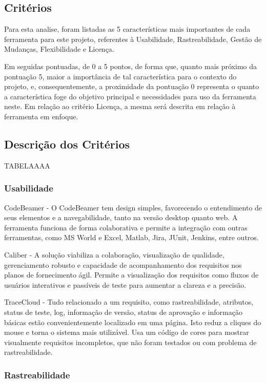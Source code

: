 \subsection {Critérios}

Para esta analise, foram listadas as 5 características mais importantes de cada ferramenta para este projeto, referentes à Usabilidade, Rastreabilidade, Gestão de Mudanças, Flexibilidade e Licença.

Em seguidas pontuadas, de 0 a 5 pontos, de forma que, quanto mais próximo da pontuação 5, maior a importância de tal característica para o contexto do projeto, e, consequentemente, a proximidade da pontuação 0 representa o quanto a característica foge do objetivo principal e necessidades para uso da ferramenta neste. Em relação ao critério Licença, a mesma será descrita em relação à ferramenta em enfoque.

\subsection {Descrição dos Critérios}

TABELAAAA

\subsubsection{Usabilidade}

CodeBeamer - O CodeBeamer tem design simples, favorecendo o entendimento de seus elementos e a navegabilidade, tanto na versão desktop quanto web. A ferramenta funciona de forma colaborativa e permite a integração com outras ferramentas, como MS World e Excel, Matlab, Jira, JUnit, Jenkins, entre outros.

Caliber - A solução viabiliza a colaboração, visualização de qualidade, gerenciamento robusto e capacidade de acompanhamento dos requisitos nos planos de fornecimento ágil. Permite a visualização dos requisitos como fluxos de usuários interativos e passíveis de teste para aumentar a clareza e a precisão.

TraceCloud - Tudo relacionado a um requisito, como rastreabilidade, atributos, status de teste, log, informação de versão, status de aprovação e informação básicas estão convenientemente localizado em uma página. Isto reduz a cliques do mouse e torna o sistema mais utilizável. Usa um código de cores para mostrar visualmente requisitos incompletos, que não foram testados ou com problema de rastreabilidade.

\subsubsection{Rastreabilidade}

